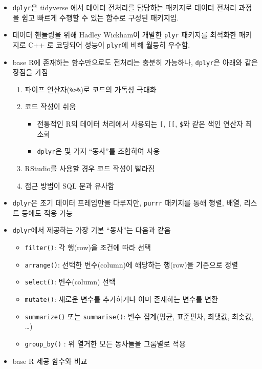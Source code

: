 \documentclass[
  11pt,
]{krantz}
\providecommand{\tightlist}{%
  \setlength{\itemsep}{0pt}\setlength{\parskip}{0pt}}
\begin{document}
\normalsize

\begin{itemize}
\item
  \texttt{dplyr}은 tidyverse 에서 데이터 전처리를 담당하는 패키지로 데이터 전처리 과정을 쉽고 빠르게 수행할 수 있는 함수로 구성된 패키지임.
\item
  데이터 핸들링을 위해 Hadley Wickham이 개발한 \texttt{plyr} 패키지를 최적화한 패키지로 C++ 로 코딩되어 성능이 \texttt{plyr}에 비해 월등히 우수함.
\item
  base R에 존재하는 함수만으로도 전처리는 충분히 가능하나, \texttt{dplyr}은 아래와 같은 장점을 가짐

  \begin{enumerate}
  \def\labelenumi{\alph{enumi}.}
  \item
    파이프 연산자(\texttt{\%\textgreater{}\%})로 코드의 가독성 극대화
  \item
    코드 작성이 쉬움

    \begin{itemize}
    \tightlist
    \item
      전통적인 R의 데이터 처리에서 사용되는 \texttt{{[}}, \texttt{{[}{[}}, \texttt{\$}와 같은 색인 연산자 최소화
    \item
      \texttt{dplyr}은 몇 가지 ``동사''를 조합하여 사용
    \end{itemize}
  \item
    RStudio를 사용할 경우 코드 작성이 빨라짐
  \item
    접근 방법이 SQL 문과 유사함
  \end{enumerate}
\item
  \texttt{dplyr}은 초기 데이터 프레임만을 다루지만, \texttt{purrr} 패키지를 통해 행렬, 배열, 리스트 등에도 적용 가능
\item
  \texttt{dplyr}에서 제공하는 가장 기본 ``동사''는 다음과 같음

  \begin{itemize}
  \item
    \texttt{filter()}: 각 행(row)을 조건에 따라 선택
  \item
    \texttt{arrange()}: 선택한 변수(column)에 해당하는 행(row)을 기준으로 정렬
  \item
    \texttt{select()}: 변수(column) 선택
  \item
    \texttt{mutate()}: 새로운 변수를 추가하거나 이미 존재하는 변수를 변환
  \item
    \texttt{summarize()} 또는 \texttt{summarise()}: 변수 집계(평균, 표준편차, 최댓값, 최솟값, \ldots)
  \item
    \texttt{group\_by()} : 위 열거한 모든 동사들을 그룹별로 적용
  \end{itemize}
\item
  base R 제공 함수와 비교
\end{itemize}
\end{document}
